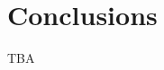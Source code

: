 \documentclass[10pt,letterpaper]{article}
\begin{document}
\section{Conclusions}
\label{sec:Conclusions}

TBA


%

%
%


\end{document}
